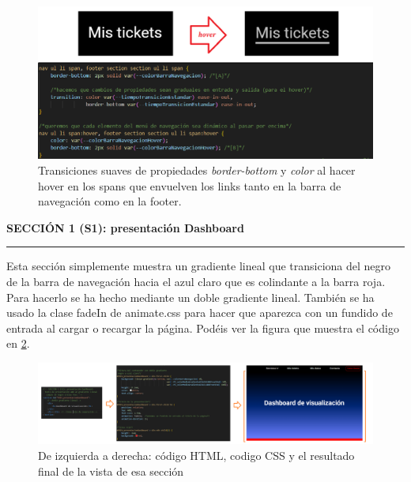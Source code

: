 \documentclass[a4paper,12pt]{report}
\begin{document}
	\FloatBarrier
	\begin{figure}[H]
		\centering
		\caption{Transiciones suaves de propiedades \textit{border-bottom }y \textit{color} al hacer hover en los spans que envuelven los links tanto en la barra de navegación como en la footer.}
		\includegraphics[width=1\linewidth]{img/linkAhover.png}
		
		\label{fig:linkAhover}
	\end{figure}
	\FloatBarrier
	
	
	
	
	
	
	
	
	\noindent \textbf{SECCIÓN 1 (S1): presentación Dashboard}
	\hrule
	\vspace{.5em}
	
	Esta sección simplemente muestra un gradiente lineal que transiciona del negro de la barra de navegación hacia el azul claro que es colindante a la barra roja. Para hacerlo se ha hecho mediante un doble gradiente lineal. También se ha usado la clase fadeIn de animate.css para hacer que aparezca con un fundido de entrada al cargar o recargar la página. Podéis ver la figura que muestra el código en \ref{fig:S1FrontMakeOf}.
	
	\FloatBarrier
	\setlength{\belowcaptionskip}{3pt}
	\begin{figure}[H]
		\centering
		\caption{De izquierda a derecha: código HTML, codigo CSS y el resultado final de la vista de esa sección}
		\includegraphics[width=1\linewidth]{img/S1FrontMakeOf.png}
		
		
		\label{fig:S1FrontMakeOf}
	\end{figure}
	\FloatBarrier
	
\end{document}
